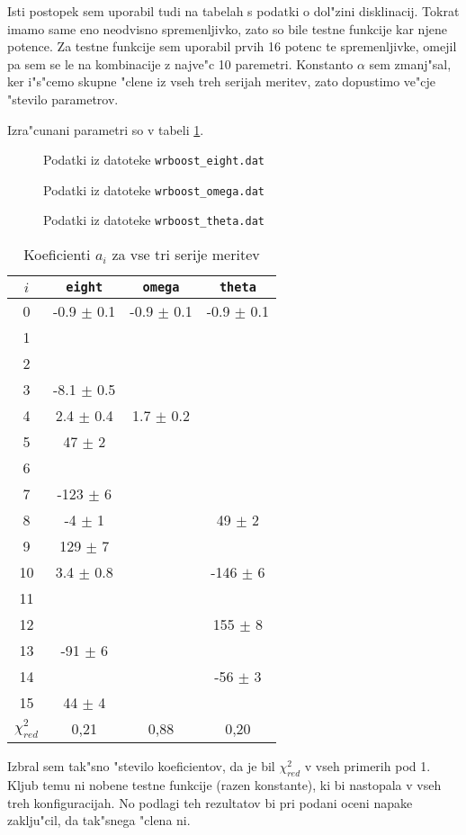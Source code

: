 \documentclass[a4paper,10pt]{article}
\newcommand{\slika}[2]{
\begin{figure}[h]
 
  \caption{#2}
  \label{fig:#1}
\end{figure}
}
\begin{document}
Isti postopek sem uporabil tudi na tabelah s podatki o dol"zini disklinacij. Tokrat imamo same eno neodvisno spremenljivko, zato so bile testne funkcije kar njene potence. Za testne funkcije sem uporabil prvih 16 potenc te spremenljivke, omejil pa sem se le na kombinacije z najve"c 10 paremetri. Konstanto $\alpha$ sem zmanj"sal, ker i"s"cemo skupne "clene iz vseh treh serijah meritev, zato dopustimo ve"cje "stevilo parametrov. 


Izra"cunani parametri so v tabeli \ref{tab:wrboost}. 

\slika{kris-e}{Podatki iz datoteke \texttt{wrboost\_eight.dat}}
\slika{kris-o}{Podatki iz datoteke \texttt{wrboost\_omega.dat}}
\slika{kris-t}{Podatki iz datoteke \texttt{wrboost\_theta.dat}}

\begin{table}
 \centering
\begin{tabular}{|c|c|c|c|}
\hline
$i$ & \texttt{eight} & \texttt{omega} & \texttt{theta} \\
\hline
0 & -0.9 $\pm$ 0.1 & -0.9 $\pm$ 0.1 & -0.9 $\pm$ 0.1 \\
1 & & & \\
2 & & & \\
3 & -8.1 $\pm$ 0.5 & & \\
4 & 2.4 $\pm$ 0.4 & 1.7 $\pm$ 0.2 & \\
5 & 47 $\pm$ 2 & & \\
6 & & & \\
7 & -123 $\pm$ 6 & & \\
8 & -4 $\pm$ 1 & & 49 $\pm$ 2 \\
9 & 129 $\pm$ 7 & &  \\
10 & 3.4 $\pm$ 0.8 & & -146 $\pm$ 6 \\
11 & & & \\
12 & & & 155 $\pm$ 8 \\
13 & -91 $\pm$ 6 & & \\
14 & & & -56 $\pm$ 3 \\
15 & 44 $\pm$ 4 & & \\
\hline
$\chi^2_{red}$ & 0,21 & 0,88 & 0,20 \\
\hline

\end{tabular}
\caption{Koeficienti $a_i$ za vse tri serije meritev}
\label{tab:wrboost}
\end{table}

Izbral sem tak"sno "stevilo koeficientov, da je bil $\chi^2_{red}$ v vseh primerih pod 1. Kljub temu ni nobene testne funkcije (razen konstante), ki bi nastopala v vseh treh konfiguracijah. No podlagi teh rezultatov bi pri podani oceni napake zaklju"cil, da tak"snega "clena ni. 
\end{document}
